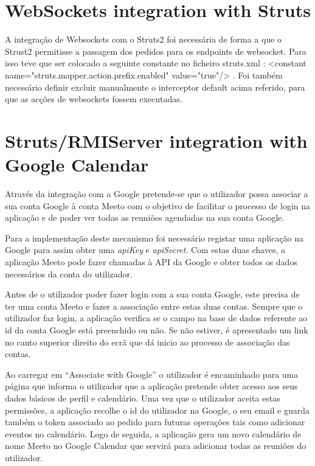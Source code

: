 \documentclass[12pt]{article} %
\begin{document}
\section{WebSockets integration with Struts}
\label{sec:except}

A integração de Websockets com o Struts2 foi necessária de forma a que o Strust2 permitisse a passagem dos pedidos para os endpoints de websocket. Para isso teve que ser colocado a seguinte constante no ficheiro struts.xml : <constant name="struts.mapper.action.prefix.enabled" value="true"/> . Foi também necessário definir excluir manualmente o interceptor default acima referido, para que as acções de websockets fossem executadas.


\pagebreak

\section{Struts/RMIServer integration with Google Calendar}


Através da integração com a Google pretende-se que o utilizador possa associar a sua conta Google à conta Meeto com o objetivo de facilitar o processo de login na aplicação e de poder ver todas as reuniões agendadas na sua conta Google.

Para a implementação deste mecanismo foi necessário registar uma aplicação na Google para assim obter uma \emph{apiKey} e \emph{apiSecret}. Com estas duas chaves, a aplicação Meeto pode fazer chamadas à API da Google e obter todos os dados necessários da conta do utilizador.

Antes de o utilizador poder fazer login com a sua conta Google, este precisa de ter uma conta Meeto e fazer a associação entre estas duas contas. Sempre que o utilizador faz login, a aplicação verifica se o campo na base de dados referente ao id da conta Google está preenchido ou não. Se não estiver, é apresentado um link no canto superior direito do ecrã que dá inicio ao processo de associação das contas.

Ao carregar em “Associate with Google” o utilizador é encaminhado para uma página que informa o utilizador que a aplicação pretende obter acesso aos seus dados básicos de perfil e calendário. Uma vez que o utilizador aceita estas permissões, a aplicação recolhe o id do utilizador na Google, o seu email e guarda também o token associado ao pedido para futuras operações tais como adicionar eventos no calendário. Logo de seguida, a aplicação gera um novo calendário de nome Meeto no Google Calendar que servirá para adicionar todas as reuniões do utilizador.
\end{document}
